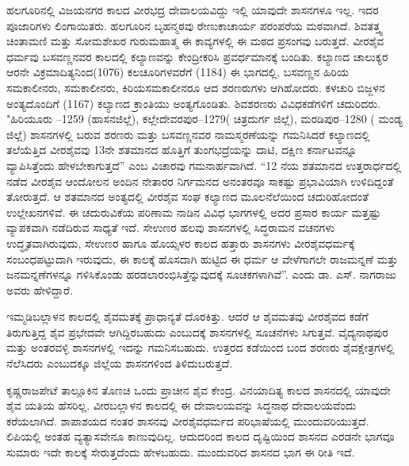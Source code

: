 ಹಲಗೂರಿನಲ್ಲಿ ವಿಜಯನಗರ ಕಾಲದ ವೀರಭದ್ರ ದೇವಾಲಯವಿದ್ದು ಇಲ್ಲಿ ಯಾವುದೇ ಶಾಸನಗಳೂ ಇಲ್ಲ. ಇದರ ಪೂಜಾರಿಗಳು ಲಿಂಗಾಯಿತರು. ಹಲಗೂರಿನ ಬೃಹನ್ಮಠವು ರೇಣುಕಾಚಾರ್ಯ ಪರಂಪರೆಯ ಮಠವಾಗಿದೆ. ಶಿವತತ್ತ್ವ ಚಿಂತಾಮಣಿ ಮತ್ತು ಸೋಮಶೇಖರ ಗುರುಮಹಾತ್ಮ ಈ ಕಾವ್ಯಗಳಲ್ಲಿ ಈ ಮಠದ ಪ್ರಸಂಗವು ಬರುತ್ತದೆ. ವೀರಶೈವ ಧರ್ಮವು ಬಸವಣ್ಣನವರ ಕಾಲದಲ್ಲಿ ಕಲ್ಯಾಣವನ್ನು ಕೇಂದ್ರೀಕರಿಸಿ ಪ್ರವರ್ಧಮಾನಕ್ಕೆ ಬಂದಿತು. ಕಲ್ಯಾಣದ ಚಾಲುಕ್ಯರ ಆರನೇ ವಿಕ್ರಮಾದಿತ್ಯನಿಂದ(1076) ಕಲಚೂರಿಗಳವರೆಗೆ (1184) ಈ ಭಾಗದಲ್ಲಿ, ಬಸವಣ್ಣನ ಹಿರಿಯ ಸಮಕಾಲೀನರು, ಸಮಕಾಲೀನರು, ಕಿರಿಯಸಮಕಾಲೀನರೂ ಆದ ಶರಣರುಗಳು ಆಗಿಹೋದರು. ಕಳಚುರಿ ಬಿಜ್ಜಳನ ಅಂತ್ಯದೊಂದಿಗೆ (1167) ಕಲ್ಯಾಣದ ಕ್ರಾಂತಿಯು ಅಂತ್ಯಗೊಂಡಿತು. ಶಿವಶರಣರು ವಿವಿಧಕಡೆಗಳಿಗೆ ಚದುರಿದರು. "ಹಿರಿಯೂರು –1259 (ಹಾಸನಜಿಲ್ಲೆ), ಕಲ್ಲೇದೇವರಪುರ–1279( ಚಿತ್ರದುರ್ಗ ಜಿಲ್ಲೆ), ಮರಡಿಪುರ–1280 ( ಮಂಡ್ಯ ಜಿಲ್ಲೆ) ಶಾಸನಗಳಲ್ಲಿ ಬರುವ ಶರಣರು ಮತ್ತು ಬಸವಣ್ಣನವರ ನಾಮಸ್ಮರಣೆಯನ್ನು ಗಮನಿಸಿದರೆ ಕಲ್ಯಾಣದಲ್ಲಿ ತಲೆಯೆತ್ತಿದ ವೀರಶೈವವು 13ನೇ ಶತಮಾನದ ಹೊತ್ತಿಗೆ ತುಂಗಭದ್ರೆಯನ್ನು ದಾಟಿ, ದಕ್ಷಿಣ ಕರ್ನಾಟವನ್ನೂ ವ್ಯಾಪಿಸಿತ್ತೆಂದು ಹೇಳಬೇಕಾಗುತ್ತದೆ” ಎಂಬ ವಿಚಾರವು ಗಮನಾರ್ಹವಾಗಿದೆ. “12 ನೆಯ ಶತಮಾನದ ಉತ್ತರಾರ್ಧದಲ್ಲಿ ನಡೆದ ವೀರಶೈವ ಆಂದೋಲನ ಅಂದಿನ ನೇತಾರರ ನಿರ್ಗಮನದ ಅನಂತರವೂ ಸಾಕಷ್ಟು ಪ್ರಭಾವಿಯಾಗಿ ಉಳಿದಿದ್ದಂತೆ ತೋರುತ್ತದೆ. ಆ ಶತಮಾನದ ಅಂತ್ಯದಲ್ಲಿ ವೀರಶೈವ ಸಂಘ ಕಲ್ಯಾಣದ ಮೂಲನೆಲೆಯಿಂದ ಚದುರಿಹೋದಂತೆ ಉಲ್ಲೇಖನಗಳಿವೆ. ಈ ಚದುರುವಿಕೆಯ ಪರಿಣಾಮ ನಾಡಿನ ವಿವಿಧ ಭಾಗಗಳಲ್ಲಿ ಅದರ ಪ್ರಸಾರ ಕಾರ್ಯ ಮತ್ತಷ್ಟು ವ್ಯಾಪಕವಾಗಿ ನಡೆದಿರುವ ಸಾಧ್ಯತೆ ಇದೆ. ಸೇಉಣರ ಹಲವು ಶಾಸನಗಳಲ್ಲಿ ಸಿದ್ಧರಾಮನ ವಚನಗಳು ಉದ್ಧೃತವಾಗಿರುವುದು, ಸೇಉಣರ ಹಾಗೂ ಹೊಯ್ಸಳರ ಕಾಲದ ಹತ್ತಾರು ಶಾಸನಗಳು ವೀರಶೈವಧರ್ಮಕ್ಕೆ ಸಂಬಂಧಪಟ್ಟುದಾಗಿ ಇರುವುದು, ಈ ಕಾಲಕ್ಕೆ ಹೊಸದಾಗಿ ಹುಟ್ಟಿದ ಈ ಧರ್ಮ ಆ ವೇಳೆಗಾಗಲೇ ರಾಜಮನ್ನಣೆ ಮತ್ತು ಜನಮನ್ನಣೆಗಳನ್ನೂ ಗಳಿಸಿಕೊಂಡು ಹರಡಲಾರಂಭಿಸಿತ್ತೆನ್ನುವುದಕ್ಕೆ ಸೂಚಕಗಳಾಗಿವೆ”. ಎಂದು ಡಾ. ಎಸ್​. ನಾಗರಾಜು ಅವರು ಹೇಳಿದ್ದಾರೆ.

ಇಮ್ಮಡಿಬಲ್ಲಾಳನ ಕಾಲದಲ್ಲಿ ಶೈವಮತಕ್ಕೆ ಪ್ರಾಧಾನ್ಯತೆ ದೊರಕಿತ್ತು. ಆದರೆ ಆ ಶೈವಮತವು ವೀರಶೈವದ ಕಡೆಗೆ ತಿರುಗುತ್ತಿದ್ದ ಶೈವ ಪ್ರಭೇದವೇ ಆಗಿದ್ದಿರಬಹುದು ಎಂಬುದಕ್ಕೆ ಶಾಸನಗಳಲ್ಲಿ ಸೂಚನೆಗಳು ಸಿಗುತ್ತವೆ. ವೈದ್ಯನಾಥಪುರ ಮತ್ತು ಅಂತರವಳ್ಳಿ ಶಾಸನಗಳಲ್ಲಿ ಇದನ್ನು ಗಮನಿಸಬಹುದು. ಉತ್ತರದ ಕಡೆಯಿಂದ ಬಂದ ಶರಣರು ಶೈವಕ್ಷೇತ್ರಗಳಲ್ಲಿ ನೆಲೆಸಿದರು ಎಂಬುದಕ್ಕೂ ಜಿಲ್ಲೆಯ ಶಾಸನಗಳಿಂದ ತಿಳಿದುಬರುತ್ತದೆ.

ಕೃಷ್ಣರಾಜಪೇಟೆ ತಾಲ್ಲೂಕಿನ ತೊಣಚಿ ಒಂದು ಪ್ರಾಚೀನ ಶೈವ ಕೇಂದ್ರ. ವಿನಯಾದಿತ್ಯ ಕಾಲದ ಶಾಸನದಲ್ಲಿ ಯಾವುದೇ ಶೈವ ಯತಿಯ ಹೆಸರಿಲ್ಲ. ವೀರಬಲ್ಲಾಳನ ಕಾಲದಲ್ಲಿ ಈ ದೇವಾಲಯವನ್ನು ಸಿದ್ಧನಾಥ ದೇವಾಲಯವೆಂದು ಕರೆಯಲಾಗಿದೆ. ಶಾಪಾಶಯದ ನಂತರ ಶಾಸನವು ವೀರಶೈವಧರ್ಮದ ಪರಿಭಾಷೆಯಲ್ಲಿ ಮುಂದುವರಿಯುತ್ತದೆ. ಲಿಪಿಯಲ್ಲಿ ಅಂತಹ ವ್ಯತ್ಯಾಸವೇನೂ ಕಾಣುವುದಿಲ್ಲ. ಆದುದರಿಂದ ಕಾಲದ ದೃಷ್ಟಿಯಿಂದ ಶಾಸನದ ಎರಡನೇ ಭಾಗವೂ ಸುಮಾರು ಇದೇ ಕಾಲಕ್ಕೆ ಸೇರುತ್ತದೆಂದು ಹೇಳಬಹುದು. ಮುಂದುವರಿದ ಶಾಸನದ ಭಾಗ ಈ ರೀತಿ ಇದೆ.

